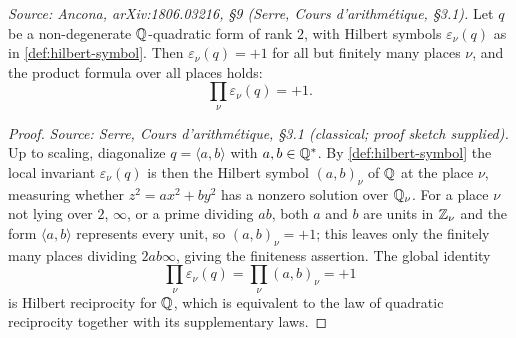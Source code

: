 \begin{theorem}
  \label{thm:product-formula}
  \textit{Source: Ancona, arXiv:1806.03216, §9 (Serre, \emph{Cours d'arithmétique}, §3.1).}
  Let \(q\) be a non-degenerate \(\mathbb{Q}\)-quadratic form of rank \(2\), with Hilbert
  symbols \(\varepsilon_\nu(q)\) as in \cref{def:hilbert-symbol}. Then
  \(\varepsilon_\nu(q) = +1\) for all but finitely many places \(\nu\), and the
  product formula over all places holds:
  \[\prod_\nu \varepsilon_\nu(q) = +1.\]
\end{theorem}

\begin{proof}
  \textit{Source: Serre, Cours d'arithmétique, §3.1 (classical; proof sketch
  supplied).}
  Up to scaling, diagonalize \(q = \langle a, b \rangle\) with
  \(a, b \in \mathbb{Q}^*\). By \cref{def:hilbert-symbol} the local invariant
  \(\varepsilon_\nu(q)\) is then the Hilbert symbol \((a,b)_\nu\) of \(\mathbb{Q}\) at
  the place \(\nu\), measuring whether \(z^2 = a x^2 + b y^2\) has a nonzero
  solution over \(\mathbb{Q}_\nu\). For a place \(\nu\) not lying over \(2\), \(\infty\),
  or a prime dividing \(ab\), both \(a\) and \(b\) are units in \(\mathbb{Z}_\nu\) and
  the form \(\langle a, b \rangle\) represents every unit, so
  \((a,b)_\nu = +1\); this leaves only the finitely many places dividing
  \(2 a b \infty\), giving the finiteness assertion. The global identity
  \[\prod_\nu \varepsilon_\nu(q) = \prod_\nu (a,b)_\nu = +1\]
  is Hilbert reciprocity for \(\mathbb{Q}\), which is equivalent to the law of quadratic
  reciprocity together with its supplementary laws.
\end{proof}

